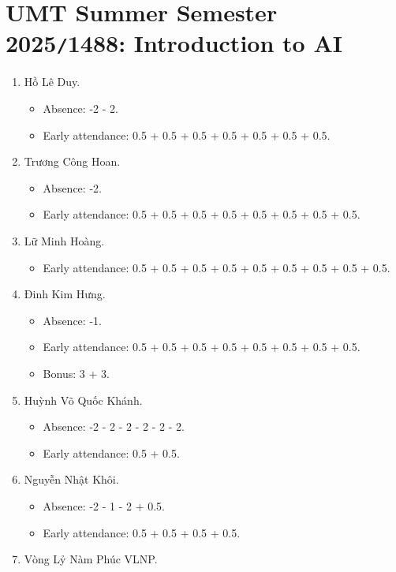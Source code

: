 \documentclass{article}
\begin{document}

\section{UMT Summer Semester 2025{\tt/}1488: Introduction to AI}

\begin{enumerate}
	\item {\sc Hồ Lê Duy.}
	\begin{itemize}
		\item Absence: -2 - 2.
		\item Early attendance: 0.5 + 0.5 + 0.5 + 0.5 + 0.5 + 0.5 + 0.5.
	\end{itemize}
	\item {\sc Trương Công Hoan.}
	\begin{itemize}
		\item Absence: -2.
		\item Early attendance: 0.5 + 0.5 + 0.5 + 0.5 + 0.5 + 0.5 + 0.5 + 0.5.
	\end{itemize}
	\item {\sc Lữ Minh Hoàng.}
	\begin{itemize}
		\item Early attendance: 0.5 + 0.5 + 0.5 + 0.5 + 0.5 + 0.5 + 0.5 + 0.5 + 0.5.
	\end{itemize}
	\item {\sc Đinh Kim Hưng.}
	\begin{itemize}
        \item Absence: -1.
		\item Early attendance: 0.5 + 0.5 + 0.5 + 0.5 + 0.5 + 0.5 + 0.5 + 0.5.
		\item Bonus: 3 + 3.
	\end{itemize}
	\item {\sc Huỳnh Võ Quốc Khánh.}
	\begin{itemize}
		\item Absence: -2 - 2 - 2 - 2 - 2 - 2.
		\item Early attendance: 0.5 + 0.5.
	\end{itemize}
	\item {\sc Nguyễn Nhật Khôi.}
	\begin{itemize}
		\item Absence: -2 - 1 - 2  + 0.5.
		\item Early attendance: 0.5 + 0.5 + 0.5 + 0.5.
	\end{itemize}
	\item {\sc Vòng Lỷ Nàm Phúc {VLNP}.}

\end{enumerate}
\end{document}
